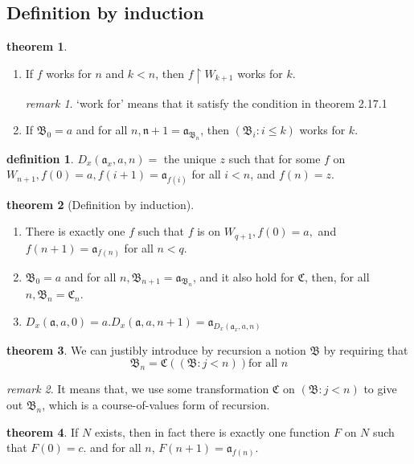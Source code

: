 \documentclass[a4paper,11pt]{article}%
\theoremstyle{remark}
\newtheorem*{remark}{remark}
\theoremstyle{definition}
\newtheorem{theorem}{theorem}[section]
\theoremstyle{definition}
\newtheorem*{definition}{definition}
\theoremstyle{plain}
\theoremstyle{definition}
\begin{document}
\subsection{Definition by induction}
\begin{theorem}
    \begin{enumerate}
        \item If $f$ works for $n$ and $k<n$, then $f\upharpoonright W_{k+1}$ works for $k$.
        \begin{remark}
            `work for' means that it satisfy the condition in theorem 2.17.1
        \end{remark}
        \item If $\mathfrak{B}_0=a$ and for all $n,\mathfrak{n+1}=\mathfrak{a}_{\mathfrak{B}_n}$, then $(\mathfrak{B}_i:i\leq k)$ works for $k$.
    \end{enumerate}
\end{theorem}
\begin{definition}
    $D_x(\mathfrak{a}_x,a,n)=$ the unique $z$ such that for some $f$ on $W_{n+1},f(0)=a,f(i+1)=\mathfrak{a}_{f(i)}$
    for all $i<n$, and $f(n)=z$.
\end{definition}
\begin{theorem}[Definition by induction]
   \begin{enumerate}
    \item There is exactly one $f$ such that $f$ is on $W_{q+1},f(0)=a,$ and $f(n+1)=\mathfrak{a}_{f(n)}$ for all $n<q$.
    \item $\mathfrak{B}_0=a$ and for all $n,\mathfrak{B}_{n+1}=\mathfrak{a}_{\mathfrak{B}_n}$, and it also hold for $\mathfrak{C}$, then, for all $n,\mathfrak{B}_n=\mathfrak{C}_n$.
    \item $D_x(\mathfrak{a},a,0)=a.D_x(\mathfrak{a},a, n+1)=\mathfrak{a}_{D_x(\mathfrak{a}_x,a,n)}$
   \end{enumerate} 
\end{theorem}
\begin{theorem}
    We can justibly introduce by recursion a notion $\mathfrak{B}$ by requiring that 
    \[\mathfrak{B}_n=\mathfrak{C}((\mathfrak{B}:j<n)) \text{for all }n\]
    \begin{remark}
        It means that, we use some transformation $\mathfrak{C}$ on $(\mathfrak{B}:j<n)$ to give out $\mathfrak{B}_n$,
        which is a course-of-values form of recursion.
    \end{remark}
\end{theorem}
\begin{theorem}
    If $N$ exists, then in fact there is exactly one function $F$ on $N$ such that $F(0)=c$.
    and for all $n$, $F(n+1)=\mathfrak{a}_{f(n)}$.
\end{theorem}
\end{document}
